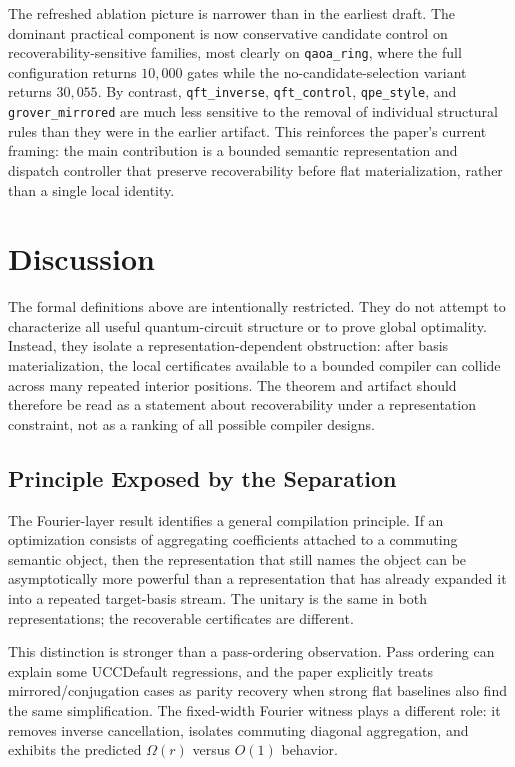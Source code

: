 \documentclass[11pt]{article}
\begin{document}
The refreshed ablation picture is narrower than in the earliest draft. The dominant practical component is now conservative candidate control on recoverability-sensitive families, most clearly on \texttt{qaoa\_ring}, where the full configuration returns $10{,}000$ gates while the no-candidate-selection variant returns $30{,}055$. By contrast, \texttt{qft\_inverse}, \texttt{qft\_control}, \texttt{qpe\_style}, and \texttt{grover\_mirrored} are much less sensitive to the removal of individual structural rules than they were in the earlier artifact. This reinforces the paper's current framing: the main contribution is a bounded semantic representation and dispatch controller that preserve recoverability before flat materialization, rather than a single local identity.

\section{Discussion}
\label{sec:discussion}

The formal definitions above are intentionally restricted. They do not attempt
to characterize all useful quantum-circuit structure or to prove global
optimality. Instead, they isolate a representation-dependent obstruction:
after basis materialization, the local certificates available to a bounded
compiler can collide across many repeated interior positions. The theorem and
artifact should therefore be read as a statement about recoverability under a
representation constraint, not as a ranking of all possible compiler designs.

\subsection{Principle Exposed by the Separation}

The Fourier-layer result identifies a general compilation principle. If an
optimization consists of aggregating coefficients attached to a commuting
semantic object, then the representation that still names the object can be
asymptotically more powerful than a representation that has already expanded it
into a repeated target-basis stream. The unitary is the same in both
representations; the recoverable certificates are different.

This distinction is stronger than a pass-ordering observation. Pass ordering
can explain some UCCDefault regressions, and the paper explicitly treats
mirrored/conjugation cases as parity recovery when strong flat baselines also
find the same simplification. The fixed-width Fourier witness plays a
different role: it removes inverse cancellation, isolates commuting diagonal
aggregation, and exhibits the predicted $\Omega(r)$ versus $O(1)$ behavior.
\end{document}

